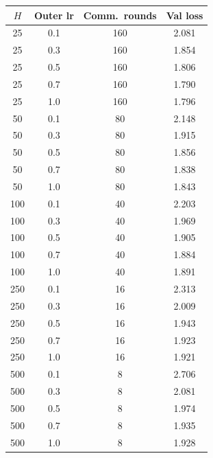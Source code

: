 \begin{tabular}{cccc}
\toprule
$H$ & Outer lr & Comm.\ rounds & Val loss \\
\midrule
25 & 0.1 & 160 & 2.081 \\
25 & 0.3 & 160 & 1.854 \\
25 & 0.5 & 160 & 1.806 \\
25 & 0.7 & 160 & 1.790 \\
25 & 1.0 & 160 & 1.796 \\
50 & 0.1 & 80 & 2.148 \\
50 & 0.3 & 80 & 1.915 \\
50 & 0.5 & 80 & 1.856 \\
50 & 0.7 & 80 & 1.838 \\
50 & 1.0 & 80 & 1.843 \\
100 & 0.1 & 40 & 2.203 \\
100 & 0.3 & 40 & 1.969 \\
100 & 0.5 & 40 & 1.905 \\
100 & 0.7 & 40 & 1.884 \\
100 & 1.0 & 40 & 1.891 \\
250 & 0.1 & 16 & 2.313 \\
250 & 0.3 & 16 & 2.009 \\
250 & 0.5 & 16 & 1.943 \\
250 & 0.7 & 16 & 1.923 \\
250 & 1.0 & 16 & 1.921 \\
500 & 0.1 & 8 & 2.706 \\
500 & 0.3 & 8 & 2.081 \\
500 & 0.5 & 8 & 1.974 \\
500 & 0.7 & 8 & 1.935 \\
500 & 1.0 & 8 & 1.928 \\
\bottomrule
\end{tabular}
